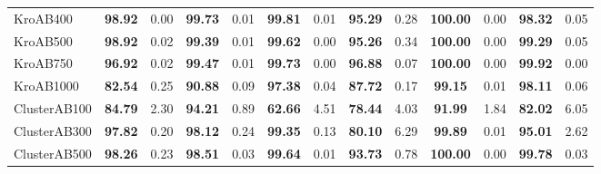{\begin{longtable}[c]{lcccccccccccc}
    KroAB400                      & \textbf{98.92}                & 0.00                           & \textbf{99.73}                 & 0.01                     & \textbf{99.81}              & 0.01                      & \textbf{95.29}           & 0.28   & \textbf{100.00} & 0.00   & \textbf{98.32}  & 0.05  \\
    KroAB500                      & \textbf{98.92}                & 0.02                           & \textbf{99.39}                 & 0.01                     & \textbf{99.62}              & 0.00                      & \textbf{95.26}           & 0.34   & \textbf{100.00} & 0.00   & \textbf{99.29}  & 0.05  \\
    KroAB750                      & \textbf{96.92}                & 0.02                           & \textbf{99.47}                 & 0.01                     & \textbf{99.73}              & 0.00                      & \textbf{96.88}           & 0.07   & \textbf{100.00} & 0.00   & \textbf{99.92}  & 0.00  \\
    KroAB1000                     & \textbf{82.54}                & 0.25                           & \textbf{90.88}                 & 0.09                     & \textbf{97.38}              & 0.04                      & \textbf{87.72}           & 0.17   & \textbf{99.15}  & 0.01   & \textbf{98.11}  & 0.06  \\

    ClusterAB100                  & \textbf{84.79}                & 2.30                           & \textbf{94.21}                 & 0.89                     & \textbf{62.66}              & 4.51                      & \textbf{78.44}           & 4.03   & \textbf{91.99}  & 1.84   & \textbf{82.02}  & 6.05  \\
    ClusterAB300                  & \textbf{97.82}                & 0.20                           & \textbf{98.12}                 & 0.24                     & \textbf{99.35}              & 0.13                      & \textbf{80.10}           & 6.29   & \textbf{99.89}  & 0.01   & \textbf{95.01}  & 2.62  \\
    ClusterAB500                  & \textbf{98.26}                & 0.23                           & \textbf{98.51}                 & 0.03                     & \textbf{99.64}              & 0.01                      & \textbf{93.73}           & 0.78   & \textbf{100.00} & 0.00   & \textbf{99.78}  & 0.03  \\


\end{longtable}}
